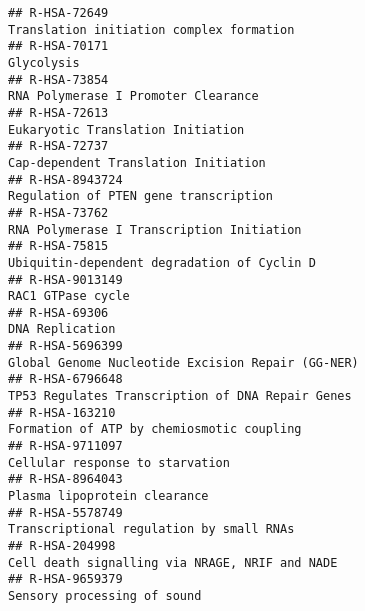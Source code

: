 \documentclass[
]{article}
\begin{document}
\begin{verbatim}
## R-HSA-72649                                                                                               Translation initiation complex formation
## R-HSA-70171                                                                                                                             Glycolysis
## R-HSA-73854                                                                                                    RNA Polymerase I Promoter Clearance
## R-HSA-72613                                                                                                      Eukaryotic Translation Initiation
## R-HSA-72737                                                                                                   Cap-dependent Translation Initiation
## R-HSA-8943724                                                                                                Regulation of PTEN gene transcription
## R-HSA-73762                                                                                              RNA Polymerase I Transcription Initiation
## R-HSA-75815                                                                                            Ubiquitin-dependent degradation of Cyclin D
## R-HSA-9013149                                                                                                                    RAC1 GTPase cycle
## R-HSA-69306                                                                                                                        DNA Replication
## R-HSA-5696399                                                                                    Global Genome Nucleotide Excision Repair (GG-NER)
## R-HSA-6796648                                                                                     TP53 Regulates Transcription of DNA Repair Genes
## R-HSA-163210                                                                                             Formation of ATP by chemiosmotic coupling
## R-HSA-9711097                                                                                                      Cellular response to starvation
## R-HSA-8964043                                                                                                         Plasma lipoprotein clearance
## R-HSA-5578749                                                                                             Transcriptional regulation by small RNAs
## R-HSA-204998                                                                                        Cell death signalling via NRAGE, NRIF and NADE
## R-HSA-9659379                                                                                                          Sensory processing of sound

\end{verbatim}
\end{document}
